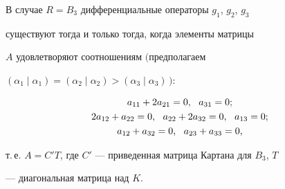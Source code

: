 \begin{lem}


В случае $R=B_3$ дифференциальные операторы $g_1$, $g_2$, $g_3$ 


существуют тогда и только тогда, когда элементы матрицы


$A$ удовлетворяют соотношениям $($предполагаем


$(\alpha_1\mid\alpha_1)=(\alpha_2\mid\alpha_2)>(\alpha_3\mid\alpha_3)\,){:}$


\begin{gather}


a_{11}+2a_{21}=0,\ \  a_{31}=0; \notag \\


2a_{12}+a_{22}=0,\ \ a_{22}+2a_{32}=0,\ \  a_{13}=0; \\


a_{12}+a_{32}=0,\ \  a_{23}+a_{33}=0, \notag


\end{gather}


т.\,е. $A=C'T$, где $C'$ --- приведенная матрица Картана для $B_3$, $T$


--- диагональная матрица над $K$.


\end{lem}





